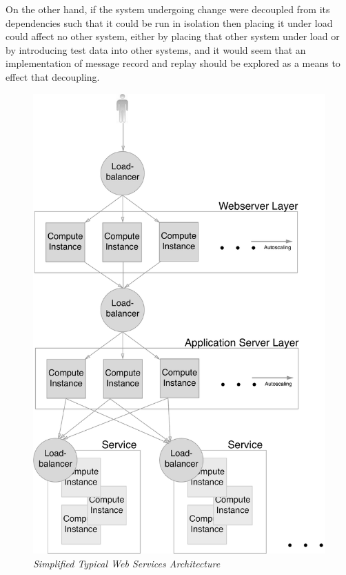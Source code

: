 \documentclass[]{final_report}
\begin{document}
On the other hand, if the system undergoing change were decoupled from its dependencies such that it could be run in isolation then placing it under load could affect no other system, either by placing that other system under load or by introducing test data into other systems, and it would seem that an implementation of message record and replay should be explored as a means to effect that decoupling.

\begin{figure}
\begin{center}
\includegraphics[scale=0.3]{figures/Webservice_fig.pdf}
\caption{\small \sl Simplified Typical Web Services Architecture \label{fig:webservice_architecture}}
\end{center} 
\end{figure}
\end{document}

